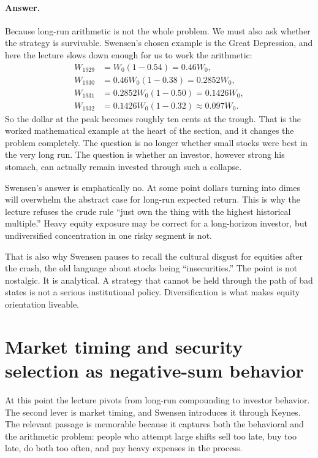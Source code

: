 \paragraph{Answer.} Because long-run arithmetic is not the whole problem. We must also ask whether the strategy is survivable. Swensen's chosen example is the Great Depression, and here the lecture slows down enough for us to work the arithmetic:
\begin{align}
W_{1929} &= W_0(1-0.54)=0.46W_0,\\
W_{1930} &= 0.46W_0(1-0.38)=0.2852W_0,\\
W_{1931} &= 0.2852W_0(1-0.50)=0.1426W_0,\\
W_{1932} &= 0.1426W_0(1-0.32)\approx 0.097W_0.
\end{align}
So the dollar at the peak becomes roughly ten cents at the trough. That is the worked mathematical example at the heart of the section, and it changes the problem completely. The question is no longer whether small stocks were best in the very long run. The question is whether an investor, however strong his stomach, can actually remain invested through such a collapse.

Swensen's answer is emphatically no. At some point dollars turning into dimes will overwhelm the abstract case for long-run expected return. This is why the lecture refuses the crude rule ``just own the thing with the highest historical multiple.'' Heavy equity exposure may be correct for a long-horizon investor, but undiversified concentration in one risky segment is not.

That is also why Swensen pauses to recall the cultural disgust for equities after the crash, the old language about stocks being ``insecurities.'' The point is not nostalgic. It is analytical. A strategy that cannot be held through the path of bad states is not a serious institutional policy. Diversification is what makes equity orientation liveable.

\section{Market timing and security selection as negative-sum behavior}

At this point the lecture pivots from long-run compounding to investor behavior. The second lever is market timing, and Swensen introduces it through Keynes. The relevant passage is memorable because it captures both the behavioral and the arithmetic problem: people who attempt large shifts sell too late, buy too late, do both too often, and pay heavy expenses in the process.

